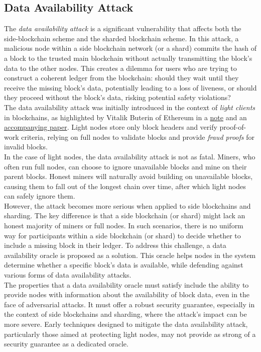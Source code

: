 \subsection{Data Availability Attack}
The \textit{data availability attack} is a significant vulnerability that affects both the side-blockchain scheme and the sharded blockchain scheme. In this attack, a malicious node within a side blockchain network (or a shard) commits the hash of a block to the trusted main blockchain without actually transmitting the block's data to the other nodes. This creates a dilemma for users who are trying to construct a coherent ledger from the blockchain: should they wait until they receive the missing block's data, potentially leading to a loss of liveness, or should they proceed without the block's data, risking potential safety violations?\\
The data availability attack was initially introduced in the context of \textit{light clients} in blockchains, as highlighted by Vitalik Buterin of Ethereum in a \href{https://github.com/ethereum/research/wiki/A-note-on-data-availability-and-erasure-coding}{note} and an \href{https://arxiv.org/abs/1809.09044}{accompanying paper}. Light nodes store only block headers and verify proof-of-work criteria, relying on full nodes to validate blocks and provide \textit{fraud proofs} for invalid blocks.\\
In the case of light nodes, the data availability attack is not as fatal. Miners, who often run full nodes, can choose to ignore unavailable blocks and mine on their parent blocks. Honest miners will naturally avoid building on unavailable blocks, causing them to fall out of the longest chain over time, after which light nodes can safely ignore them.\\
However, the attack becomes more serious when applied to side blockchains and sharding. The key difference is that a side blockchain (or shard) might lack an honest majority of miners or full nodes. In such scenarios, there is no uniform way for participants within a side blockchain (or shard) to decide whether to include a missing block in their ledger. To address this challenge, a data availability oracle is proposed as a solution. This oracle helps nodes in the system determine whether a specific block's data is available, while defending against various forms of data availability attacks.\\
The properties that a data availability oracle must satisfy include the ability to provide nodes with information about the availability of block data, even in the face of adversarial attacks. It must offer a robust security guarantee, especially in the context of side blockchains and sharding, where the attack's impact can be more severe. Early techniques designed to mitigate the data availability attack, particularly those aimed at protecting light nodes, \cite{reference1, reference4} may not provide as strong of a security guarantee as a dedicated oracle.\\
